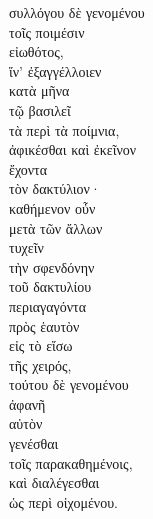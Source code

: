 {\large
\begin{greek}
\noindent συλλόγου δὲ γενομένου \\
\tabto{2em} τοῖς ποιμέσιν \\
εἰωθότος, \\
\tabto{2em} ἵν' ἐξαγγέλλοιεν \\
\tabto{4em} κατὰ μῆνα \\
\tabto{4em} τῷ βασιλεῖ \\
\tabto{2em} τὰ περὶ τὰ ποίμνια, \\
ἀφικέσθαι καὶ ἐκεῖνον \\
\tabto{2em} ἔχοντα \\
\tabto{4em} τὸν δακτύλιον· \\
καθήμενον οὖν \\
\tabto{2em} μετὰ τῶν ἄλλων \\
τυχεῖν \\
τὴν σφενδόνην \\
\tabto{2em} τοῦ δακτυλίου \\
περιαγαγόντα \\
\tabto{2em} πρὸς ἑαυτὸν \\
\tabto{2em} εἰς τὸ εἴσω \\
\tabto{4em} τῆς χειρός, \\
τούτου δὲ γενομένου\\
\tabto{2em} ἀφανῆ \\
\tabto{4em} αὐτὸν \\
\tabto{2em} γενέσθαι \\
\tabto{4em} τοῖς παρακαθημένοις, \\

\tabto{2em} καὶ διαλέγεσθαι\\
\tabto{4em} ὡς περὶ οἰχομένου. \\

\end{greek}
}

